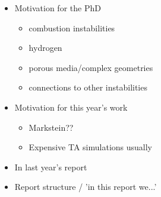 \begin{itemize}
\item Motivation for the PhD
    \begin{itemize}
    \item combustion instabilities
    \item hydrogen
    \item porous media/complex geometries
    \item connections to other instabilities
    \end{itemize}
\item Motivation for this year's work
    \begin{itemize}
    \item Markstein??
    \item Expensive TA simulations usually
    \end{itemize}
\item In last year's report
\item Report structure / 'in this report we...'
\end{itemize}


